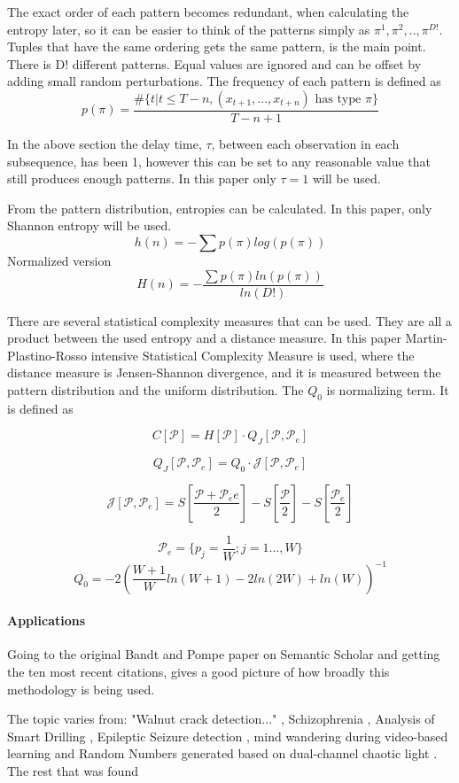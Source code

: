 The exact order of each pattern becomes redundant, when calculating the entropy later, so it can be easier to think of the patterns simply as $\pi^1,\pi^2,..,\pi^{D!}$. Tuples that have the same ordering gets the same pattern, is the main point. There is D! different patterns. Equal values are ignored and can be offset by adding small random perturbations. The frequency of each pattern is defined as
$$p(\pi)=\frac{\#\{t|t\leq T-n,(x_{t+1},...,x_{t+n}) \mbox{ has type }\pi\}}{T-n+1}$$
\cite{Bandt2002}

In the above section the delay time, $\tau$, between each observation in each subsequence, has been 1, however this can be set to any reasonable value that still produces enough patterns. In this paper only $\tau=1$ will be used.

From the pattern distribution, entropies can be calculated. In this paper, only Shannon entropy will be used. 
$$h(n)=-\sum p(\pi) log(p(\pi))$$
Normalized version
$$H(n)=-\frac{\sum p(\pi) ln(p(\pi))}{ln(D!)}$$

There are several statistical complexity measures that can be used. They are all a product between the used entropy and a distance measure. In this paper Martin-Plastino-Rosso intensive Statistical Complexity Measure is used, where the distance measure is Jensen-Shannon divergence, and it is measured between the pattern distribution and the uniform distribution. The $Q_0$ is normalizing term. It is defined as

$$C[\mathscr{P}]=H[\mathscr{P}]\cdot Q_J[\mathscr{P},\mathscr{P}_e]$$

$$Q_J[\mathscr{P},\mathscr{P}_e]=Q_0\cdot \mathscr{J}[\mathscr{P},\mathscr{P}_e]$$

$$\mathscr{J}[\mathscr{P},\mathscr{P}_e]=S[\frac{\mathscr{P}+\mathscr{P}_ee}{2}]-S[\frac{\mathscr{P}}{2}]-S[\frac{\mathscr{P}_e}{2}]$$

$$\mathscr{P}_e=\{p_j=\frac{1}{W};j=1...,W\}$$
$$Q_0 = -2(\frac{W+1}{W}ln(W+1)-2ln(2W)+ln(W))^{-1}$$
\cite{Amigo2023b}

\paragraph{Applications}
Going to the original Bandt and Pompe paper \cite{Bandt2002} on Semantic Scholar and getting the ten most recent citations, gives a good picture of how broadly this methodology is being used.

The topic varies from: "Walnut crack detection..." \cite{Zhang2024}, Schizophrenia \cite{Wang2024}, Analysis of Smart Drilling \cite{Szwajka2024}, Epileptic Seizure detection \cite{AbhishekParikh2024}, mind wandering during video-based learning \cite{Tang2024} and Random Numbers generated based on dual-channel chaotic light \cite{Liu2024}. The rest that was found \cite{Demirel2024, Du2024, Sun2024, Li2024}

